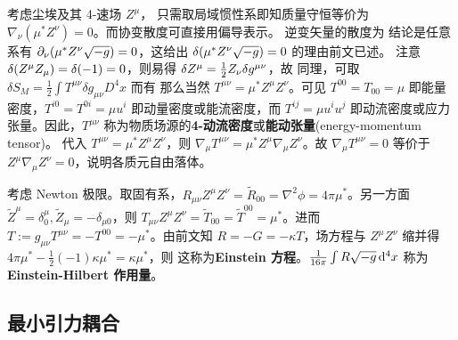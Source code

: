 考虑尘埃及其 4-速场 $Z^\mu$，
只需取局域惯性系即知质量守恒等价为 $\nabla_\nu(\mu^* Z^\nu)=0$。而协变散度可直接用偏导表示。
逆变矢量的散度为
结论是任意系有 $\partial_\nu(\mu^* Z^\nu\sqrt{-g})=0$，这给出 $\var(\mu^* Z^\nu\sqrt{-g})=0$ 的理由前文已述。
注意 $\var(Z^\mu Z_\mu)=\var(-1)=0$，则易得 $\var Z^\mu=\frac 12 Z_\nu \var g^{\mu\nu}$，故
同理，可取 $\delta S_M =\frac{1}{2} \int T^{\mu \nu} \delta g_{\mu \nu} D^4{x}$ 而有
那么当然 $T^{\mu\nu}=\mu^* Z^\mu Z^\nu$。可见 $T^{00}=T_{00}=\mu$ 即能量密度，$T^{i0}=T^{0i}=\mu u^i $ 即动量密度或能流密度，而 $T^{ij}=\mu u^i u^j$ 即动流密度或应力张量。因此，$T^{\mu\nu}$ 称为物质场源的\textbf{4-动流密度}或\textbf{能动张量}(energy-momentum tensor)。
代入 $T^{\mu\nu}=\mu^* Z^\mu Z^\nu$，则 $\nabla_\mu T^{\mu\nu}=\mu^* Z^\mu\nabla_\mu Z^\nu$。故 $\nabla_\mu T^{\mu\nu}=0$ 等价于 $Z^\mu\nabla_\mu Z^\nu =0$，说明各质元自由落体。

考虑 Newton 极限。取固有系，$R_{\mu\nu}Z^\mu Z^\nu=\tilde R_{00}=\nabla^2\phi= 4\pi\mu^*$。另一方面 $\tilde Z^\mu=\delta^\mu_0,\tilde Z_\mu=-\delta_{\mu 0}$，则 $T_{\mu\nu}Z^\mu Z^\nu=\tilde T_{00}=\tilde T^{00}=\mu^*$。进而 $T:=g_{\mu\nu}T^{\mu\nu}=-T^{00}=-\mu^*$。由前文知 $R=-G=-\kappa T$，场方程与 $Z^\mu Z^\nu$ 缩并得 $4\pi\mu^*-\frac 12 (-1)\kappa \mu^*=\kappa\mu^*$，则
这称为\textbf{Einstein 方程}。$\frac{1}{16\pi}\int R \sqrt{-g}\dd[4]{x}$ 称为\textbf{Einstein-Hilbert 作用量}。

\subsection{最小引力耦合}

